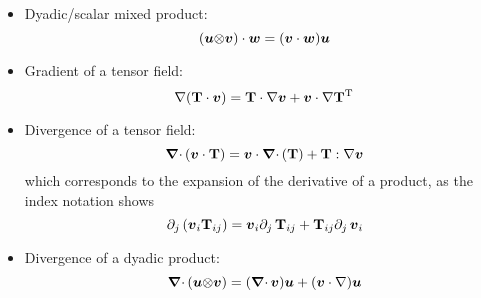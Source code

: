 \begin{itemize}
\item Dyadic/scalar mixed product:
\begin{equation}
(\uu\Tens\vv)\cdot\ww = (\vv\cdot\ww)\uu
\end{equation}

\item Gradient of a tensor field:
\begin{equation}
\nabla(\tT\cdot\vv) = \tT\cdot\nabla\vv + \vv\cdot\nabla\tT\T
\end{equation}

\item Divergence of a tensor field:
\begin{equation}
\Div(\vv\cdot\tT) = \vv\cdot\Div(\tT) + \tT : \nabla\vv
\end{equation}
which corresponds to the expansion of the derivative of a product, as the index notation shows
\begin{equation}
\pd{j}(\vv_i\tT_{ij}) = \vv_i\pd{j}\tT_{ij} + \tT_{ij}\pd{j}\vv_i
\end{equation}

\item Divergence of a dyadic product:
\begin{equation}
\Div(\uu\Tens\vv) = (\Div \vv)\uu + (\vv\cdot\nabla)\uu
\end{equation}
\end{itemize}
